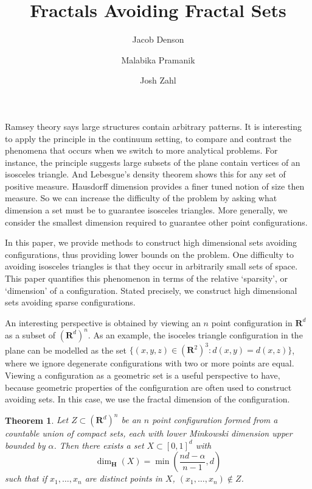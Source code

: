 \documentclass{article}
\title{Fractals Avoiding Fractal Sets}
\author{Jacob Denson\\ \and Malabika Pramanik\\ \and Josh Zahl}
\theoremstyle{plain}
\theoremstyle{plain}
\newtheorem{theorem}{Theorem}
\begin{document}
\maketitle




Ramsey theory says large structures contain arbitrary patterns. It is interesting to apply the principle in the continuum setting, to compare and contrast the phenomena that occurs when we switch to more analytical problems. For instance, the principle suggests large subsets of the plane contain vertices of an isosceles triangle. And Lebesgue's density theorem shows this for any set of positive measure. Hausdorff dimension provides a finer tuned notion of size then measure. So we can increase the difficulty of the problem by asking what dimension a set must be to guarantee isosceles triangles. More generally, we consider the smallest dimension required to guarantee other point configurations.

In this paper, we provide methods to construct high dimensional sets avoiding configurations, thus providing lower bounds on the problem. One difficulty to avoiding isosceles triangles is that they occur in arbitrarily small sets of space. This paper quantifies this phenomenon in terms of the relative `sparsity', or `dimension' of a configuration. Stated precisely, we construct high dimensional sets avoiding sparse configurations.

An interesting perspective is obtained by viewing an $n$ point configuration in $\mathbf{R}^d$ as a subset of $(\mathbf{R}^d)^n$. As an example, the isoceles triangle configuration in the plane can be modelled as the set $\{ (x,y,z) \in (\mathbf{R}^2)^3 : d(x,y) = d(x,z) \}$, where we ignore degenerate configurations with two or more points are equal. Viewing a configuration as a geometric set is a useful perspective to have, because geometric properties of the configuration are often used to construct avoiding sets. In this case, we use the fractal dimension of the configuration.

\begin{theorem}
	Let $Z \subset (\mathbf{R}^d)^n$ be an $n$ point configuration formed from a countable union of compact sets, each with lower Minkowski dimension upper bounded by $\alpha$. Then there exists a set $X \subset [0,1]^d$ with
	\[ \dim_{\mathbf{H}}(X) = \min \left( \frac{nd - \alpha}{n-1}, d \right) \]
	such that if $x_1, \dots, x_n$ are distinct points in $X$, $(x_1, \dots, x_n) \not \in Z$.
\end{theorem}
\end{document}

